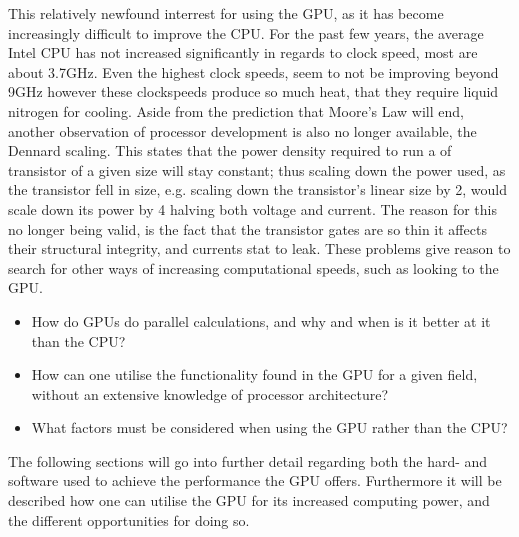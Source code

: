 This relatively newfound interrest for using the GPU, as it has become increasingly difficult to improve the CPU.
For the past few years, the average Intel CPU has not increased significantly in regards to clock speed, most are about 3.7GHz.
Even the highest clock speeds, seem to not be improving beyond 9GHz however these clockspeeds produce so much heat, that they require liquid nitrogen for cooling.
Aside from the prediction that Moore's Law will end, another observation of processor development is also no longer available, the Dennard scaling.
This states that the power density required to run a of transistor of a given size will stay constant; thus scaling down the power used, as the transistor fell in size, e.g. scaling down the transistor's linear size by 2, would scale down its power by 4 halving both voltage and current. \citep{DennardScaling}
The reason for this no longer being valid, is the fact that the transistor gates are so thin it affects their structural integrity, and currents stat to leak. \citep{CPUClockSpeeds}
These problems give reason to search for other ways of increasing computational speeds, such as looking to the GPU.


\begin{itemize}
	\item How do GPUs do parallel calculations, and why and when is it better at it than the CPU?
	\item How can one utilise the functionality found in the GPU for a given field, without an extensive knowledge of processor architecture?
	\item What factors must be considered when using the GPU rather than the CPU? 
\end{itemize}

The following sections will go into further detail regarding both the hard- and software used to achieve the performance the GPU offers.
Furthermore it will be described how one can utilise the GPU for its increased computing power, and the different opportunities for doing so. 

\newpage
